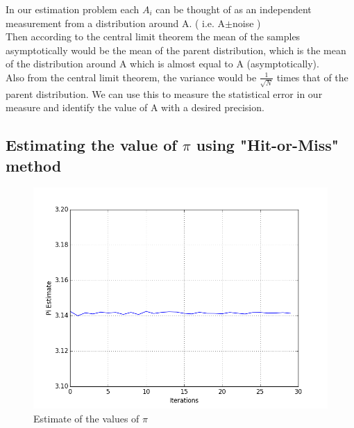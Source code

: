 \documentclass[a4paper,11pt]{article}
\begin{document}
In our estimation problem each $A_{i}$ can be thought of as an independent measurement from a distribution around A. ( i.e. A$\pm$noise )\\
Then according to the central limit theorem the mean of the samples asymptotically would be the mean of the parent distribution, which is the mean of the distribution around A which is almost equal to A (asymptotically).\\
Also from the central limit theorem, the variance would be $\frac{1}{\sqrt{N}}$ times that of the parent distribution. We can use this to measure the statistical error in our measure and identify the value of A with a desired precision.

\subsection{Estimating the value of $\pi$ using "Hit-or-Miss" method}\label{prob1b}
\begin{figure}[ht]
	\centering
    \includegraphics[scale=0.80]{pi_est.png}
    \caption{Estimate of the values of $\pi$}
	\label{fig:Y1}
\end{figure}
\end{document}
